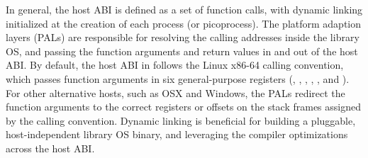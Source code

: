 


In general, the host ABI is defined as a set of function calls, with dynamic linking initialized at the creation of each process (or picoprocess).
The platform adaption layers (PALs)
are responsible for
resolving the calling addresses inside the library OS, and passing the function arguments and return values in and out of the host ABI.
By default, the host ABI in \graphene{} follows the Linux x86-64 calling convention,
which passes function arguments in six general-purpose registers (, , , , , and ).
For other alternative hosts,
such as OSX and Windows, the PALs redirect
the function arguments to the correct registers or offsets on the stack frames assigned by the calling convention.
Dynamic linking is beneficial for
building a pluggable, host-independent library OS binary, and leveraging the compiler optimizations across the host ABI.









